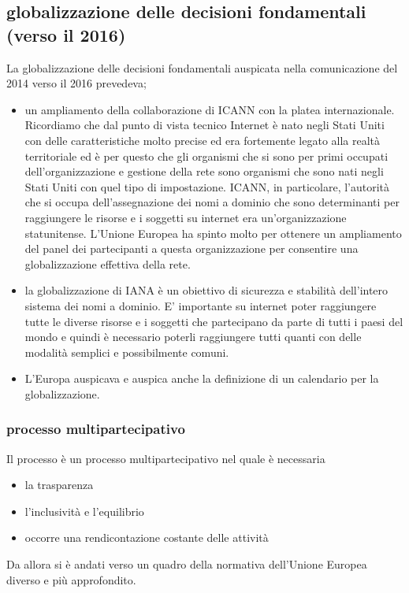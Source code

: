 \subsection{globalizzazione delle decisioni fondamentali (verso il 2016)}
La globalizzazione delle decisioni fondamentali auspicata nella comunicazione del 2014 verso il 2016 prevedeva;
\begin{itemize}
    \item un ampliamento della collaborazione di ICANN con la platea internazionale. Ricordiamo che dal punto di vista tecnico Internet è nato negli Stati Uniti con delle caratteristiche molto precise ed era fortemente legato alla realtà territoriale ed è per questo che gli organismi che si sono per primi occupati dell'organizzazione e gestione della rete sono organismi che sono nati negli Stati Uniti con quel tipo di impostazione. ICANN, in particolare, l'autorità che si occupa dell'assegnazione dei nomi a dominio che sono determinanti per raggiungere le risorse e i soggetti su internet era un'organizzazione statunitense. L'Unione Europea ha spinto molto per ottenere un ampliamento del panel dei partecipanti a questa organizzazione per consentire una globalizzazione effettiva della rete.
    \item la globalizzazione di IANA è un obiettivo di sicurezza e stabilità dell'intero sistema dei nomi a dominio. E' importante su internet poter raggiungere tutte le diverse risorse e i soggetti che partecipano da parte di tutti i paesi del mondo e quindi è necessario poterli raggiungere tutti quanti con delle modalità semplici e possibilmente comuni.
    \item L'Europa auspicava e auspica anche la definizione di un calendario per la globalizzazione.
\end{itemize}
\par
\subsubsection{processo multipartecipativo}

Il processo è un processo multipartecipativo nel quale è necessaria
\begin{itemize}
    \item la trasparenza
    \item l'inclusività  e l'equilibrio
    \item occorre una rendicontazione costante delle attività
\end{itemize}

Da allora si è andati verso un quadro della normativa dell'Unione Europea diverso e più approfondito.
